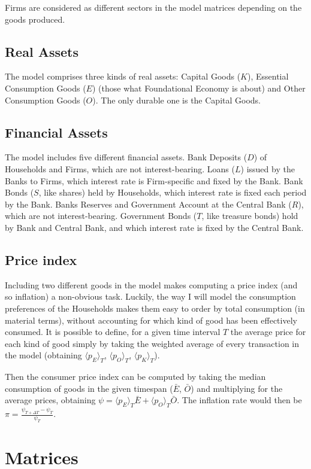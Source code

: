 \documentclass[a4paper, headings=standardclasses]{scrartcl}
\begin{document}
Firms are considered as different sectors in the model matrices depending on the goods produced.

\subsection{Real Assets}
The model comprises three kinds of real assets: Capital Goods ($K$), Essential Consumption Goods ($E$) (those what Foundational Economy is about) and Other Consumption Goods ($O$).
The only durable one is the Capital Goods.

\subsection{Financial Assets}
The model includes five different financial assets.
Bank Deposits ($D$) of Households and Firms, which are not interest-bearing.
Loans ($L$) issued by the Banks to Firms, which interest rate is Firm-specific and fixed by the Bank.
Bank Bonds ($S$, like shares) held by Households, which interest rate is fixed each period by the Bank.
Banks Reserves and Government Account at the Central Bank ($R$), which are not interest-bearing.
Government Bonds ($T$, like treasure bonds) hold by Bank and Central Bank, and which interest rate is fixed by the Central Bank.

\subsection{Price index}
Including two different goods in the model makes computing a price index (and so inflation) a non-obvious task.
Luckily, the way I will model the consumption preferences of the Households makes them easy to order by total consumption (in material terms), without accounting for which kind of good has been effectively consumed.
It is possible to define, for a given time interval $T$ the average price for each kind of good simply by taking the weighted average of every transaction in the model (obtaining $\langle p_E \rangle_T$, $\langle p_O \rangle_T$, $\langle p_K \rangle_T$).

Then the consumer price index can be computed by taking the median consumption of goods in the given timespan ($\bar{E}$, $\bar{O}$) and multiplying for the average prices, obtaining $\psi = \langle p_E \rangle_T \bar{E} + \langle p_O \rangle_T \bar{O}$. The inflation rate would then be $\pi = \frac{\psi_{T + \Delta T} - \psi_T}{\psi_T}$.


\section{Matrices}
\end{document}
